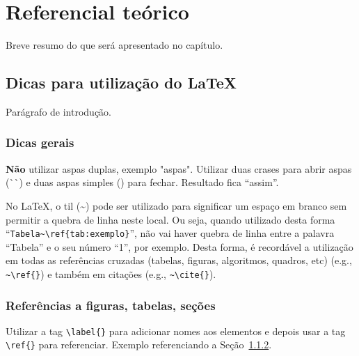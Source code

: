 \chapter{Referencial teórico}
\label{cap:capitulo2}

Breve resumo do que será apresentado no capítulo.

\section{Dicas para utilização do \LaTeX}

Parágrafo de introdução.

\subsection{Dicas gerais}

\textbf{Não} utilizar aspas duplas, exemplo "aspas".  Utilizar duas crases para abrir aspas (\`{}\`{}) e duas aspas simples (\textquotesingle\textquotesingle) para fechar. Resultado fica ``assim''. 

No \LaTeX, o til (\~{}) pode ser utilizado para significar um espaço em branco sem permitir a quebra de linha neste local. Ou seja, quando utilizado desta forma ``\verb|Tabela~\ref{tab:exemplo}|'', não vai haver quebra de linha entre a palavra ``Tabela'' e o seu número ``1'', por exemplo. Desta forma, é recordável a utilização em todas as referências cruzadas (tabelas, figuras, algoritmos, quadros, etc) (e.g., \verb|~\ref{}|) e também em citações (e.g., \verb|~\cite{}|).


\subsection{Referências a figuras, tabelas, seções}
\label{sec:usarLabels}

Utilizar a tag \verb|\label{}| para adicionar nomes aos elementos e depois usar a tag \verb|\ref{}| para referenciar. Exemplo referenciando a Seção~\ref{sec:usarLabels}. 

